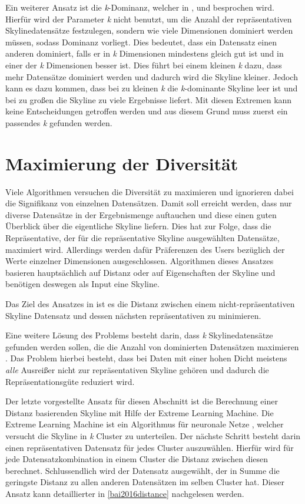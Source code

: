 Ein weiterer Ansatz ist die \textit{k}-Dominanz, welcher in \cite{Chan:2006:FKS:1142473.1142530}, \cite{Chan:2006:HDS:2117976.2118017} und \cite{5480364} besprochen wird. Hierfür wird der Parameter \textit{k} nicht benutzt, um die Anzahl der repräsentativen Skylinedatensätze festzulegen, sondern wie viele Dimensionen dominiert werden müssen, sodass Dominanz vorliegt. Dies bedeutet, dass ein Datensatz einen anderen dominiert, falls er  in \textit{k} Dimensionen mindestens gleich gut ist und in einer der \textit{k} Dimensionen besser ist. Dies führt bei einem kleinen \textit{k} dazu, dass mehr Datensätze dominiert werden und dadurch wird die Skyline kleiner. Jedoch kann es dazu kommen, dass bei zu kleinen \textit{k} die \textit{k}-dominante Skyline leer ist und bei zu großen die Skyline zu viele Ergebnisse liefert. Mit diesen Extremen kann keine Entscheidungen getroffen werden und aus diesem Grund muss zuerst ein passendes \textit{k} gefunden werden.
\section{Maximierung der Diversität}
\label{ch:Forschungsstand:sec:maxDiv}
Viele Algorithmen versuchen die Diversität zu maximieren und ignorieren dabei die Signifikanz von einzelnen Datensätzen. Damit soll erreicht werden, dass nur diverse Datensätze in der Ergebnismenge auftauchen und diese einen guten Überblick über die eigentliche Skyline liefern.
Dies hat zur Folge, dass die Repräsentative, der für die repräsentative Skyline ausgewählten Datensätze, maximiert wird. Allerdings werden dafür Präferenzen des Users bezüglich der Werte einzelner Dimensionen ausgeschlossen. Algorithmen dieses Ansatzes basieren hauptsächlich auf Distanz oder auf Eigenschaften der Skyline und benötigen deswegen als Input eine Skyline. 

Das Ziel des Ansatzes in \cite{Tao:2009:DRS:1546683.1547325} ist es die Distanz zwischen einem nicht-repräsentativen Skyline Datensatz und dessen nächsten repräsentativen zu minimieren. 

Eine weitere Lösung des Problems besteht darin, dass \textit{k} Skylinedatensätze gefunden werden sollen, die die Anzahl von dominierten Datensätzen maximieren \cite{4221657}. Das Problem hierbei besteht, dass bei Daten mit einer hohen Dicht meistens \textit{alle} Ausreißer nicht zur repräsentativen Skyline gehören und dadurch die Repräsentationsgüte reduziert wird.

Der letzte vorgestellte Ansatz für diesen Abschnitt ist die Berechnung einer Distanz basierenden Skyline mit Hilfe der Extreme Learning Machine. Die Extreme Learning Machine ist ein Algorithmus für neuronale Netze \cite{huang2006extreme}, welcher versucht die Skyline in \textit{k} Cluster zu unterteilen. Der nächste Schritt besteht darin einen repräsentativen Datensatz für jedes Cluster auszuwählen. Hierfür wird für jede Datensatzkombination in einem Cluster die Distanz zwischen diesen berechnet. Schlussendlich wird der Datensatz ausgewählt, der in Summe die geringste Distanz zu allen anderen Datensätzen im selben Cluster hat. Dieser Ansatz kann detaillierter in \ref{bai2016distance} nachgelesen werden.
